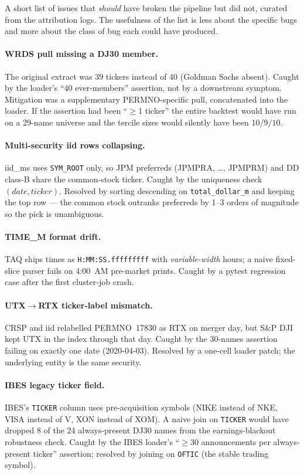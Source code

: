 \documentclass[10pt,conference,compsoc]{IEEEtran}
\begin{document}
A short list of issues that \emph{should} have broken the
pipeline but did not, curated from the attribution logs. The
usefulness of the list is less about the specific bugs and more
about the class of bug each could have produced.

\paragraph{WRDS pull missing a DJ30 member.} The original extract
was 39 tickers instead of 40 (Goldman Sachs absent). Caught by the
loader's ``40 ever-members'' assertion, not by a downstream
symptom. Mitigation was a supplementary PERMNO-specific pull,
concatenated into the loader. If the assertion had been
``$\geq$1 ticker'' the entire backtest would have run on a 29-name
universe and the tercile sizes would silently have been $10/9/10$.

\paragraph{Multi-security iid rows collapsing.} iid\_ms uses
\texttt{SYM\_ROOT} only, so JPM preferreds (JPMPRA, \ldots, JPMPRM)
and DD class-B share the common-stock ticker. Caught by the
uniqueness check $(date, ticker)$. Resolved by sorting descending
on \texttt{total\_dollar\_m} and keeping the top row --- the
common stock outranks preferreds by 1--3 orders of magnitude so
the pick is unambiguous.

\paragraph{TIME\_M format drift.} TAQ ships times as
\texttt{H:MM:SS.fffffffff} with \emph{variable-width} hours; a
naive fixed-slice parser fails on 4:00~AM pre-market prints.
Caught by a pytest regression case after the first
cluster-job crash.

\paragraph{UTX$\to$RTX ticker-label mismatch.} CRSP and iid
relabelled PERMNO~17830 as RTX on merger day, but S\&P DJI kept
UTX in the index through that day. Caught by the 30-names
assertion failing on exactly one date (2020-04-03). Resolved
by a one-cell loader patch; the underlying entity is the same
security.

\paragraph{IBES legacy ticker field.} IBES's \texttt{TICKER}
column uses pre-acquisition symbols (NIKE instead of NKE, VISA
instead of V, XON instead of XOM). A naive join on \texttt{TICKER}
would have dropped 8 of the 24 always-present DJ30 names from
the earnings-blackout robustness check. Caught by the IBES
loader's ``$\geq$30 announcements per always-present ticker''
assertion; resolved by joining on \texttt{OFTIC} (the stable
trading symbol).
\end{document}
